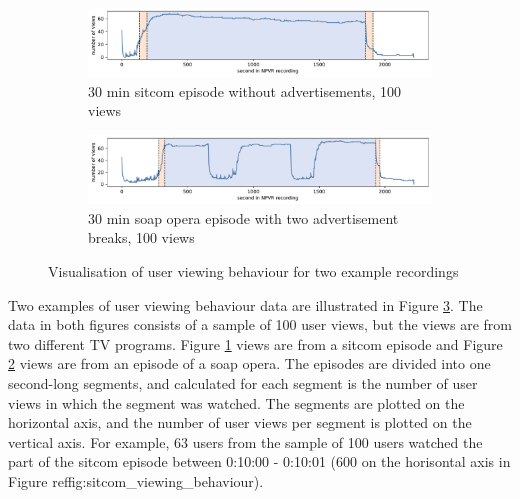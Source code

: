 \begin{figure}[h]
    \centering
    \begin{subfigure}[b]{\textwidth}
       \includegraphics[width=1\textwidth]{../plots/sitcom.pdf}
       \caption{30 min sitcom episode without advertisements, 100 views}
       \label{fig:sitcom_viewing_behaviour} 
    \end{subfigure}
    \par\bigskip
    \begin{subfigure}[b]{\textwidth}
       \includegraphics[width=1\textwidth]{../plots/soap_opera.pdf}
       \caption{30 min soap opera episode with two advertisement breaks, 100 views}
       \label{fig:soap_opera_viewing_behaviour}
    \end{subfigure}
    \caption{Visualisation of user viewing behaviour for two example recordings}
    \label{fig:user_viewing_behaviour}
\end{figure}

Two examples of user viewing behaviour data are illustrated in Figure \ref{fig:user_viewing_behaviour}. The data in both figures consists of a sample of 100 user views, but the views are from two different TV programs. Figure \ref{fig:sitcom_viewing_behaviour} views are from a sitcom episode and Figure \ref{fig:soap_opera_viewing_behaviour} views are from an episode of a soap opera. The episodes are divided into one second-long segments, and calculated for each segment is the number of user views in which the segment was watched. The segments are plotted on the horizontal axis, and the number of user views per segment is plotted on the vertical axis. For example, 63 users from the sample of 100 users watched the part of the sitcom episode between 0:10:00 - 0:10:01 (600 on the horisontal axis in Figure ref{fig:sitcom_viewing_behaviour}).

